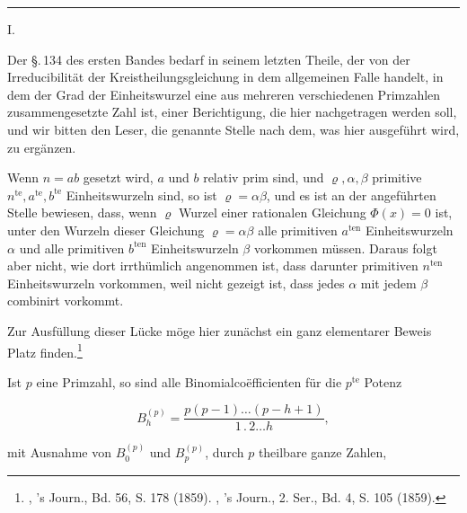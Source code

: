 \begin{center}
{\Large {}}

\rule{4em}{0.4pt}

I.

\textbf{}
\end{center}

Der \S.\,134 des ersten Bandes bedarf in seinem letzten Theile, der von der Irreducibilität der Kreistheilungsgleichung in dem allgemeinen Falle handelt, in dem der Grad der Einheitswurzel eine aus mehreren verschiedenen Primzahlen zusammengesetzte Zahl ist, einer Berichtigung, die hier nachgetragen werden soll, und wir bitten den Leser, die genannte Stelle nach dem, was hier ausgeführt wird, zu ergänzen.

Wenn $n=ab$ gesetzt wird, $a$ und $b$ relativ prim sind, und $\varrho, \alpha, \beta$ primitive $n^{\mathrm{te}}, a^{\mathrm{te}}, b^{\mathrm{te}}$ Einheitswurzeln sind, so ist $\varrho=\alpha\beta$, und es ist an der angeführten Stelle bewiesen, dass, wenn $\varrho$ Wurzel einer rationalen Gleichung $\Phi(x)=0$ ist, unter den Wurzeln dieser Gleichung $\varrho=\alpha\beta$ alle primitiven $a^{\mathrm{ten}}$ Einheitswurzeln $\alpha$ und alle primitiven $b^{\mathrm{ten}}$ Einheitswurzeln $\beta$ vorkommen müssen. Daraus folgt aber nicht, wie dort irrthümlich angenommen ist, dass darunter  primitiven $n^{\mathrm{ten}}$ Einheitswurzeln vorkommen, weil nicht gezeigt ist, dass jedes $\alpha$ mit jedem $\beta$ combinirt vorkommt.

Zur Ausfüllung dieser Lücke möge hier zunächst ein ganz elementarer Beweis Platz finden.\footnote{, 's Journ., Bd. 56, S. 178 (1859). , 's Journ., 2. Ser., Bd. 4, S. 105 (1859).}

Ist $p$ eine Primzahl, so sind alle Binomialcoëfficienten für die $p^{\mathrm{te}}$ Potenz

\[
B_h^{(p)} = \dfrac{p(p-1)\ldots(p-h+1)}{1\,.\,2\ldots h},
\]

mit Ausnahme von $B_0^{(p)}$ und $B_p^{(p)}$, durch $p$ theilbare ganze Zahlen,
